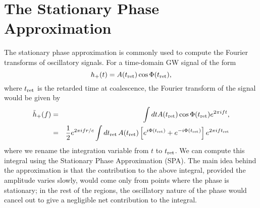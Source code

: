 
\chapter{The Stationary Phase Approximation}

The stationary phase approximation is commonly used to compute the Fourier
transforms of oscillatory signals. For a time-domain GW signal of the form
\begin{equation}
h_{+}(t) = A(t_{\rm ret}) \cos\Phi(t_{\rm ret}), 
\end{equation}
where $t_{\rm ret}$ is the retarded time at coalescence, the Fourier 
transform of the signal would be given by
\begin{eqnarray}
\tilde{h}_{+}(f) &=& \int dt A(t_{\rm ret}) \cos\Phi(t_{\rm ret}) e^{2\pi i f t},\\
 &=& \dfrac{1}{2} e^{2\pi i f r/c} \int dt_{\rm ret}\, A(t_{\rm ret}) \left[
 e^{i \Phi(t_{\rm ret})} + e^{-i \Phi(t_{\rm ret})} \right] e^{2\pi i f t_{\rm
 ret}} \nonumber
 \label{td}
\end{eqnarray}
where we rename the integration variable from $t$ to $t_{\rm ret}$. We can
compute this integral using the Stationary Phase Approximation (SPA). The main
idea behind the approximation is that the contribution to the above integral,
provided the amplitude varies slowly, would come only from points where the
phase is stationary; in the rest of the regions, the oscillatory nature of the
phase would cancel out to give a negligible net contribution to the integral.

